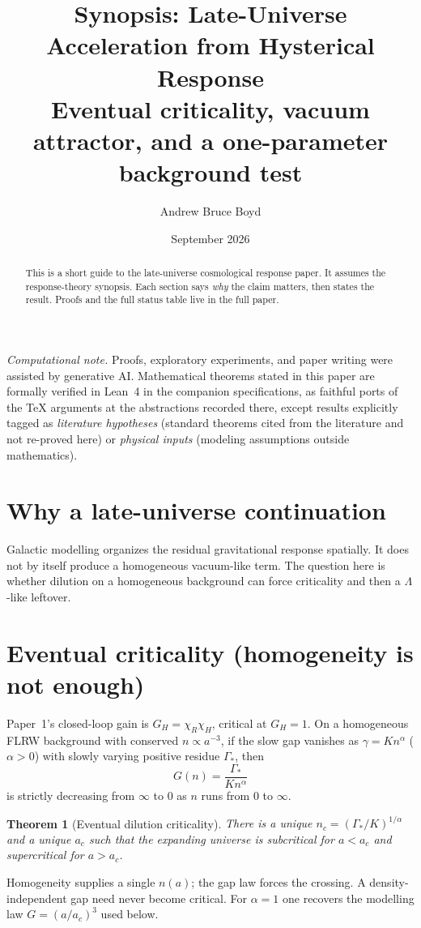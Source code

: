 \documentclass[11pt]{article}
\title{\textbf{Synopsis: Late-Universe Acceleration from Hysterical Response}\\[0.35em]
\large Eventual criticality, vacuum attractor, and a one-parameter background test}
\author{Andrew Bruce Boyd}
\date{September 2026}
\newtheorem{theorem}{Theorem}[section]
\theoremstyle{definition}
\theoremstyle{remark}
\begin{document}
\maketitle
\noindent\textit{Computational note.}
Proofs, exploratory experiments, and paper writing were assisted by generative AI.
Mathematical theorems stated in this paper are formally verified in Lean~4 in the
companion specifications, as faithful ports of the TeX arguments at the abstractions
recorded there, except results explicitly tagged as \emph{literature hypotheses}
(standard theorems cited from the literature and not re-proved here) or
\emph{physical inputs} (modeling assumptions outside mathematics).

\begin{abstract}
This is a short guide to the late-universe cosmological response paper.
It assumes the response-theory synopsis.
Each section says \emph{why} the claim matters, then states the result.
Proofs and the full status table live in the full paper.
\end{abstract}

\section{Why a late-universe continuation}
Galactic modelling organizes the residual gravitational response spatially.
It does not by itself produce a homogeneous vacuum-like term.
The question here is whether dilution on a homogeneous background can force criticality and then a $\Lambda$-like leftover.

\section{Eventual criticality (homogeneity is not enough)}
Paper~1's closed-loop gain is $G_H=\chi_R\chi_H$, critical at $G_H=1$.
On a homogeneous FLRW background with conserved $n\propto a^{-3}$, if the slow gap vanishes as $\gamma=K n^\alpha$ ($\alpha>0$) with slowly varying positive residue $\Gamma_*$, then
\[
G(n)=\frac{\Gamma_*}{K n^\alpha}
\]
is strictly decreasing from $\infty$ to $0$ as $n$ runs from $0$ to $\infty$.

\begin{theorem}[Eventual dilution criticality]
There is a unique $n_c=(\Gamma_*/K)^{1/\alpha}$ and a unique $a_c$ such that the expanding universe is subcritical for $a<a_c$ and supercritical for $a>a_c$.
\end{theorem}

Homogeneity supplies a single $n(a)$; the gap law forces the crossing.
A density-independent gap need never become critical.
For $\alpha=1$ one recovers the modelling law $G=(a/a_c)^3$ used below.
\end{document}
